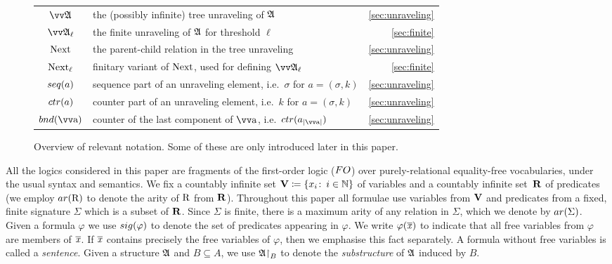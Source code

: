 \begin{figure}
\begin{tabularx}{\textwidth}{c X r}
    $\unravel{A}$ & the (possibly infinite) tree unraveling of ${\mathfrak{A}}$ & \cref{sec:unraveling} \\
    $\unravel{A}_{\ell}$ & the finite unraveling of ${\mathfrak{A}}$ for threshold $\ell$ & \cref{sec:finite} \\
    $\mathrm{Next}$ & the parent-child relation in the tree unraveling & \cref{sec:unraveling} \\
    $\mathrm{Next}_{\ell}$ & finitary variant of $\mathrm{Next}$, used for defining $\unravel{A}_{\ell}$ & \cref{sec:finite} \\
    $\seq{a}$ & sequence part of an unraveling element, i.e.\ $\sigma$ for $a = (\sigma, k)$ & \cref{sec:unraveling} \\
    $\ctr{a}$ & counter part of an unraveling element, i.e.\ $k$ for $a = (\sigma, k)$ & \cref{sec:unraveling} \\
    $\bound{\elemtuptuplea}$ & counter of the last component of $\elemtuptuplea$, i.e.\ $\ctr{a_{|\elemtuptuplea|}}$ & \cref{sec:unraveling} \\
  \end{tabularx}
  \egroup
  \caption{Overview of relevant notation. Some of these are only introduced later in this paper.}\label{fig:notation-quickref}
\end{figure}

All the logics considered in this paper are fragments of the first-order logic ($\FO$) over purely-relational equality-free vocabularies, under the usual syntax and semantics. 
We fix a countably infinite set $\mathbf{V} \coloneqq \{x_i \colon\, i \in {\mathbb{N}}\}$ of variables and a countably infinite set~$\mathbf{R}$ of predicates (we employ $\arity(\relR)$ to denote the arity of $\mathrm{R}$ from $\mathbf{R}$).
Throughout this paper all formulae use variables from $\mathbf{V}$ and predicates from a fixed, finite signature $\Sigma$ which is a subset of $\mathbf{R}$.
Since $\Sigma$ is finite, there is a maximum arity of any relation in $\Sigma$, which we denote by $\arity(\Sigma)$.
Given a formula $\varphi$ we use $\sig(\varphi)$ to denote the set of predicates appearing in $\varphi$. 
We write $\varphi(\overline{\mathit{x}})$ to indicate that all free variables from $\varphi$ are members of $\overline{\mathit{x}}$. 
If $\overline{\mathit{x}}$ contains precisely the free
variables of $\varphi$, then we emphasise this fact separately.
A formula without free variables is called a \emph{sentence}.
Given a structure ${\mathfrak{A}}$ and $B \subseteq A$, we use ${\mathfrak{A}}\mathord{\upharpoonright}_{B}$ to denote the \emph{substructure} of ${\mathfrak{A}}$ induced by $B$.\\

